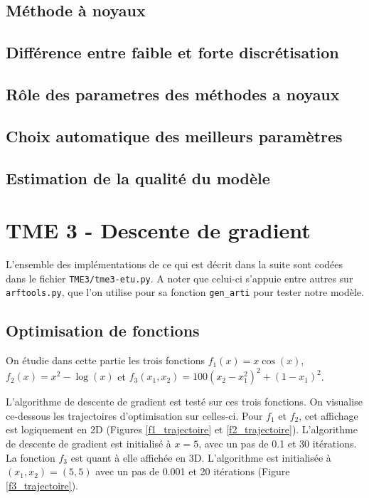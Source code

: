 \documentclass[a4paper]{article}
\begin{document}
\subsection*{Méthode à noyaux}

\subsection*{Différence entre faible et forte discrétisation}

\subsection*{Rôle des parametres des méthodes a noyaux}

\subsection*{Choix automatique des meilleurs paramètres}

\subsection*{Estimation de la qualité du modèle}

\section*{TME 3 - Descente de gradient}

L'ensemble des implémentations de ce qui est décrit dans la suite sont codées dans le fichier \verb!TME3/tme3-etu.py!. A noter que celui-ci s'appuie entre autres sur \verb!arftools.py!, que l'on utilise pour sa fonction \verb!gen_arti! pour tester notre modèle.

\subsection*{Optimisation de fonctions}

On étudie dans cette partie les trois fonctions $f_1(x) = x \cos(x)$, $f_2(x) = x^2 - \log(x)$ et $f_3(x_1, x_2) = 100(x_2-x_1^2)^2 + (1-x_1)^2$.

L'algorithme de descente de gradient est testé sur ces trois fonctions. On visualise ce-dessous les trajectoires d'optimisation sur celles-ci. Pour $f_1$ et $f_2$, cet affichage est logiquement en 2D (Figures \ref{f1_trajectoire} et \ref{f2_trajectoire}). L'algorithme de descente de gradient est initialisé à $x=5$, avec un pas de 0.1 et 30 itérations. La fonction $f_3$ est quant à elle affichée en 3D. L'algorithme est initialisée à $(x_1, x_2)=(5, 5)$ avec un pas de 0.001 et 20 itérations (Figure \ref{f3_trajectoire}).
\end{document}
